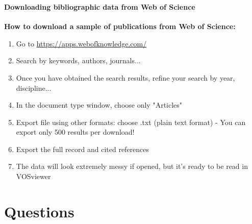 \documentclass[8pt]{beamer}
\begin{document}


\begin{frame}
	\frametitle{\insertsection}
	\framesubtitle{Downloading bibliographic data from Web of Science}
	
	\textbf{How to download a sample of publications from Web of Science:}
	\medskip
	
	
	\begin{enumerate}
		\item Go to \url{https://apps.webofknowledge.com/}
		\item Search by keywords, authors, journals... 
		\item Once you have obtained the search results, refine your search by year, discipline...
		\item In the document type window, choose only "Articles"
		\item Export file using other formats: choose .txt (plain text format)  - You can export only 500 results per download!
		\item Export the full record and cited references 
		\item The data will look extremely messy if opened, but it's ready to be read in VOSviewer
	\end{enumerate}
	
\end{frame}









\section*{Questions}


\bgroup
{}
\begin{frame}[plain]{}
\begin{center}
\color{white}{\Huge\insertsection}
\end{center}
\end{frame}
\egroup

\end{document}
